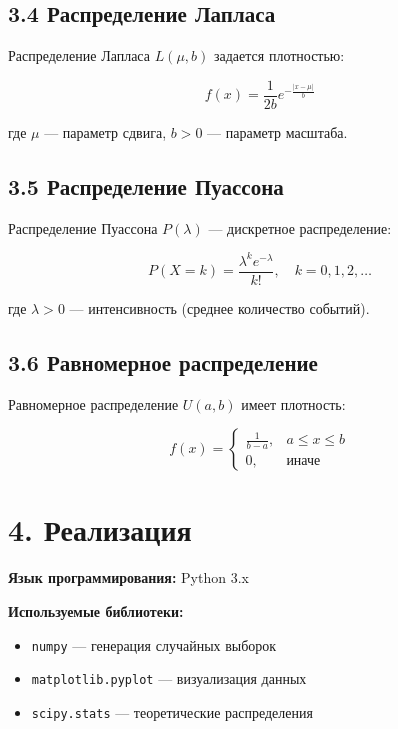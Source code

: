 \documentclass[a4paper,14pt]{extarticle}
\begin{document}
\subsection*{3.4 Распределение Лапласа}

Распределение Лапласа $L(\mu, b)$ задается плотностью:

\begin{equation}
f(x) = \frac{1}{2b} e^{-\frac{|x-\mu|}{b}}
\end{equation}

где $\mu$ — параметр сдвига, $b > 0$ — параметр масштаба.

\subsection*{3.5 Распределение Пуассона}

Распределение Пуассона $P(\lambda)$ — дискретное распределение:

\begin{equation}
P(X = k) = \frac{\lambda^k e^{-\lambda}}{k!}, \quad k = 0, 1, 2, \ldots
\end{equation}

где $\lambda > 0$ — интенсивность (среднее количество событий).

\subsection*{3.6 Равномерное распределение}

Равномерное распределение $U(a, b)$ имеет плотность:

\begin{equation}
f(x) = \begin{cases}
\frac{1}{b-a}, & a \leq x \leq b \\
0, & \text{иначе}
\end{cases}
\end{equation}

\section*{4. Реализация}

\textbf{Язык программирования:} Python 3.x

\textbf{Используемые библиотеки:}
\begin{itemize}
    \item \texttt{numpy} — генерация случайных выборок
    \item \texttt{matplotlib.pyplot} — визуализация данных
    \item \texttt{scipy.stats} — теоретические распределения
\end{itemize}
\end{document}
